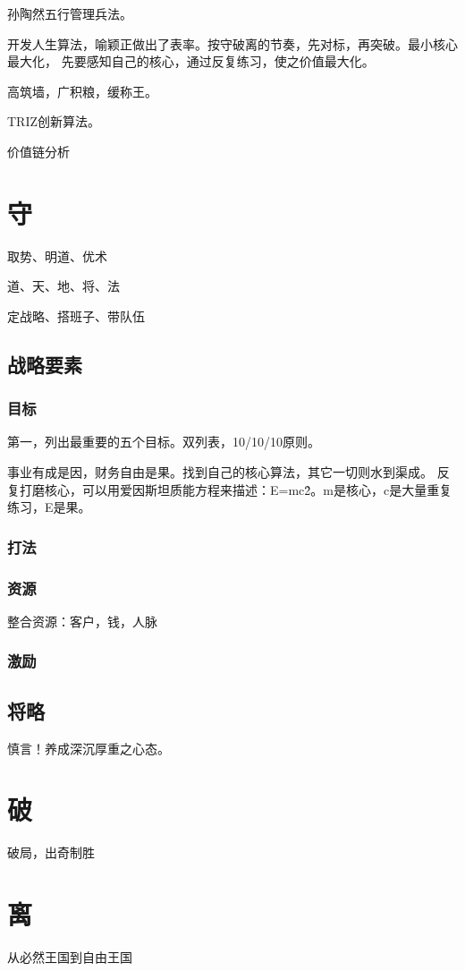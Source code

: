 孙陶然五行管理兵法。

开发人生算法，喻颖正做出了表率。按守破离的节奏，先对标，再突破。最小核心最大化，
先要感知自己的核心，通过反复练习，使之价值最大化。

高筑墙，广积粮，缓称王。

TRIZ创新算法。

价值链分析

\section{守}

取势、明道、优术

道、天、地、将、法

定战略、搭班子、带队伍

\subsection{战略要素}

\subsubsection{目标}

第一，列出最重要的五个目标。双列表，10/10/10原则。

事业有成是因，财务自由是果。找到自己的核心算法，其它一切则水到渠成。
反复打磨核心，可以用爱因斯坦质能方程来描述：E=mc\^2。m是核心，c是大量重复练习，E是果。

\subsubsection{打法}

\subsubsection{资源}

整合资源：客户，钱，人脉

\subsubsection{激励}

\subsection{将略}

慎言！养成深沉厚重之心态。

\section{破}

破局，出奇制胜

\section{离}

从必然王国到自由王国

